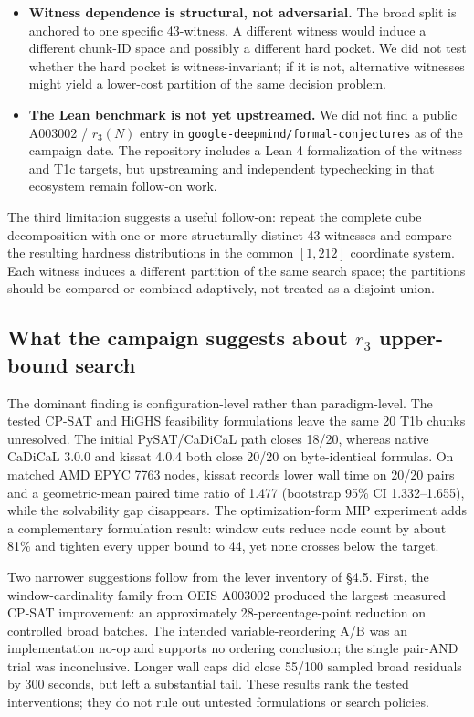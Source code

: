 \begin{itemize}
  solver order, so its paired ratio is not subject to this limitation.
\item
  \textbf{Witness dependence is structural, not adversarial.} The broad
  split is anchored to one specific 43-witness. A different
  witness would induce a different chunk-ID space and possibly a
  different hard pocket. We did not test whether the hard pocket
  is witness-invariant; if it is not, alternative witnesses might
  yield a lower-cost partition of the same decision problem.
\item
  \textbf{The Lean benchmark is not yet upstreamed.} We did not find a public
  A003002 / $r_3(N)$ entry in \texttt{google-deepmind/formal-conjectures} as of the
  campaign date. The repository includes a Lean 4 formalization of the witness
  and T1c targets, but upstreaming and independent typechecking in that
  ecosystem remain follow-on work.
\end{itemize}

The third limitation suggests a useful follow-on: repeat the complete cube
decomposition with one or more structurally distinct 43-witnesses and compare
the resulting hardness distributions in the common $[1,212]$ coordinate
system. Each witness induces a different partition of the same search space;
the partitions should be compared or combined adaptively, not treated as a
disjoint union.

\subsection{\texorpdfstring{What the campaign suggests about $r_3$ upper-bound search}{What the campaign suggests about r\_3 upper-bound search}}\label{what-the-campaign-suggests-about-r_3-upper-bound-search}

The dominant finding is configuration-level rather than paradigm-level. The
tested CP-SAT and HiGHS feasibility formulations leave the same 20 T1b chunks
unresolved. The initial PySAT/CaDiCaL path closes 18/20, whereas native
CaDiCaL 3.0.0 and kissat 4.0.4 both close 20/20 on byte-identical
formulas. On matched AMD EPYC 7763 nodes, kissat records lower wall time on
20/20 pairs and a geometric-mean paired time ratio of 1.477 (bootstrap 95\%
CI 1.332--1.655), while the solvability gap disappears. The
optimization-form MIP experiment adds a complementary formulation result:
window cuts reduce node count by about 81\% and tighten every upper bound to
44, yet none crosses below the target.

Two narrower suggestions follow from the lever inventory of §4.5.
First, the window-cardinality family from OEIS A003002 produced the largest
measured CP-SAT improvement: an approximately 28-percentage-point reduction
on controlled broad batches. The intended variable-reordering A/B was an
implementation no-op and supports no ordering conclusion; the single
pair-AND trial was inconclusive. Longer wall caps did close 55/100 sampled broad residuals by
300 seconds, but left a substantial tail. These results rank the tested
interventions; they do not rule out untested formulations or search policies.

